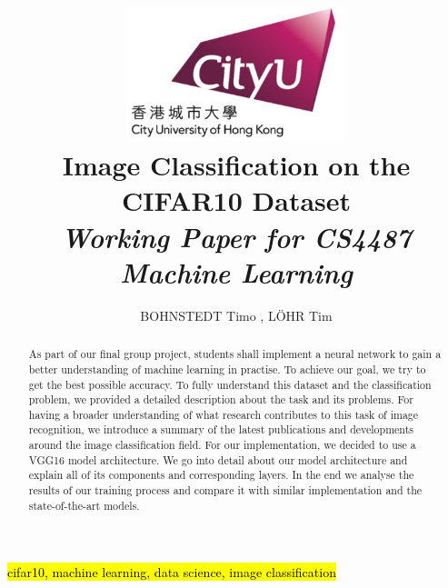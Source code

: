 \documentclass[journal]{IEEEtran}
\begin{document}
    \title{\includegraphics[width=2.5in]{photo/0_cityu} \\
    Image Classification on the CIFAR10 Dataset\\
     \textit{Working Paper for CS4487 Machine Learning}
     }
  \author{BOHNSTEDT 	Timo ,
      L\"OHR Tim\\ 
}

\maketitle
\begin{abstract}
As part of our final group project, students shall implement a neural network to gain a better understanding of machine learning in practise. To achieve our goal, we try to get the best possible accuracy. To fully understand this dataset and the classification problem, we provided a detailed description about the task and its problems. For having a broader understanding of what research contributes to this task of image recognition, we introduce a summary of the latest publications and developments around the image classification field. For our implementation, we decided to use a VGG16 model architecture. We go into detail about our model architecture and explain all of its components and corresponding layers. In the end we analyse the results of our training process and compare it with similar implementation and the state-of-the-art models. 
\end{abstract}

\begin{IEEEkeywords}
\hl{cifar10, machine learning, data science, image classification}
\end{IEEEkeywords}

\IEEEpeerreviewmaketitle

\end{document}
